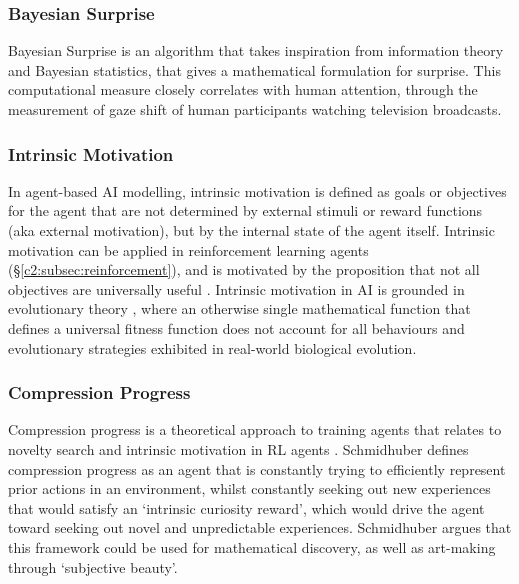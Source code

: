 \subsubsection{Bayesian Surprise}

Bayesian Surprise \citep{itti2005bayesian,itti2009bayesian} is an algorithm that takes inspiration from information theory and Bayesian statistics, that gives a mathematical formulation for surprise. 
This computational measure closely correlates with human attention, through the measurement of gaze shift of human participants watching television broadcasts.

\subsubsection{Intrinsic Motivation}

In agent-based AI modelling, intrinsic motivation is defined as goals or objectives for the agent that are not determined by external stimuli or reward functions (aka external motivation), but by the internal state of the agent itself. 
Intrinsic motivation can be applied in reinforcement learning agents \citep{chentanez2004intrinsically} (\S \ref{c2:subsec:reinforcement}), and is motivated by the proposition that not all objectives are universally useful \citep{barto2013intrinsic}.
Intrinsic motivation in AI is grounded in evolutionary theory \citep{singh2010intrinsically}, where an otherwise single mathematical function that defines a universal fitness function does not account for all behaviours and evolutionary strategies exhibited in real-world biological evolution.

\subsubsection{Compression Progress}

Compression progress \citep{schmidhuber2008driven} is a theoretical approach to training agents that relates to novelty search \citep{lehman2008exploiting} and intrinsic motivation in RL agents \citep{chentanez2004intrinsically}.
Schmidhuber defines compression progress as an agent that is constantly trying to efficiently represent prior actions in an environment, whilst constantly seeking out new experiences that would satisfy an `intrinsic curiosity reward', which would drive the agent toward seeking out novel and unpredictable experiences.
Schmidhuber argues that this framework could be used for mathematical discovery, as well as art-making through `subjective beauty'.

